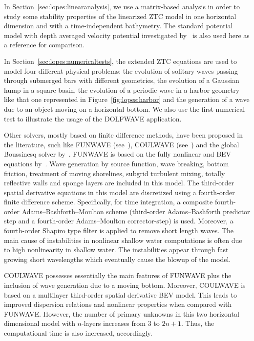 In Section~\ref{sec:lopes:linearanalysis},
we use a matrix-based analysis in order to
study some stability properties of the linearized ZTC model
in one horizontal dimension and with a time-independent
bathymetry. The standard potential model with depth averaged velocity
potential investigated by~\citet{LovholtPedersen2009} is also
used here as a reference for comparison.

In Section~\ref{sec:lopes:numericaltests}, the extended ZTC
equations are used to model four different physical
problems: the evolution of  solitary waves passing through
submerged bars with different geometries,
the evolution of a Gaussian hump in a
square basin, the evolution of a periodic wave in a harbor
geometry like that one represented in
Figure~\ref{fig:lopes:harbor} and the generation of a wave due
to an object moving on a horizontal bottom.  We also use the
first numerical test to illustrate the usage of the DOLFWAVE
application.

Other solvers, mostly based on finite difference methods,
have been proposed in the literature, such
like FUNWAVE (see~\citet{Kirby1998}), COULWAVE
(see~\citet{LynettLiu2004}) and the global Boussinesq solver
by~\citet{PedersenLovholt2008}.  FUNWAVE  is based on the
fully nonlinear and BEV  equations by~\citet{WeiKirby1995}.
Wave generation by source function, wave breaking, bottom friction, treatment of
moving shorelines, subgrid turbulent mixing, totally
reflective walls and sponge layers are included in this
model.
The third-order spatial derivative equations in this model are discretized using a
fourth-order finite difference scheme.
Specifically, for time integration, a composite fourth-order
Adams--Bashforth--Moulton scheme (third-order Adams--Bashforth
predictor step and a fourth-order Adams--Moulton corrector-step)
is used.
Moreover, a fourth-order Shapiro type filter is applied to remove short length
waves.
The main cause of instabilities in
nonlinear shallow water computations
is often due to high nonlinearity in shallow water.
The instabilities appear through fast growing short
wavelengths which eventually cause the blowup of the model.



COULWAVE possesses essentially the main features of FUNWAVE
plus the inclusion of wave generation due to a moving
bottom.  Moreover, COULWAVE is based on a multilayer
third-order spatial derivative BEV model.  This leads to
improved dispersion relations and nonlinear properties when
compared with FUNWAVE.  However, the number of primary
unknowns in this two horizontal dimensional model with
$n$-layers increases from $3$ to $2n+1$. Thus, the
computational time is also increased, accordingly.



